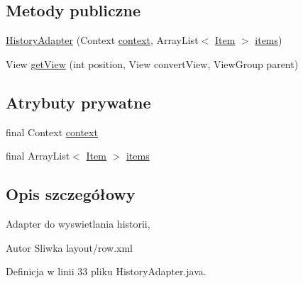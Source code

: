 \subsection*{Metody publiczne}
\begin{DoxyCompactItemize}
\item 
\hyperlink{classcom_1_1example_1_1qrpoll_1_1_history_adapter_a823c07f9fa09b58051bc1af5ada028b7}{History\+Adapter} (Context \hyperlink{classcom_1_1example_1_1qrpoll_1_1_history_adapter_a118ff9b19fe9e292e2a60fc5b42150f9}{context}, Array\+List$<$ \hyperlink{classcom_1_1example_1_1qrpoll_1_1_item}{Item} $>$ \hyperlink{classcom_1_1example_1_1qrpoll_1_1_history_adapter_adc0f747e0409d63449e90738b935ce1d}{items})
\item 
View \hyperlink{classcom_1_1example_1_1qrpoll_1_1_history_adapter_a272e253c50d2c55359900516f1eab7e6}{get\+View} (int position, View convert\+View, View\+Group parent)
\end{DoxyCompactItemize}
\subsection*{Atrybuty prywatne}
\begin{DoxyCompactItemize}
\item 
final Context \hyperlink{classcom_1_1example_1_1qrpoll_1_1_history_adapter_a118ff9b19fe9e292e2a60fc5b42150f9}{context}
\item 
final Array\+List$<$ \hyperlink{classcom_1_1example_1_1qrpoll_1_1_item}{Item} $>$ \hyperlink{classcom_1_1example_1_1qrpoll_1_1_history_adapter_adc0f747e0409d63449e90738b935ce1d}{items}
\end{DoxyCompactItemize}


\subsection{Opis szczegółowy}
Adapter do wyswietlania historii, \begin{DoxyAuthor}{Autor}
Sliwka layout/row.\+xml 
\end{DoxyAuthor}


Definicja w linii 33 pliku History\+Adapter.\+java.



